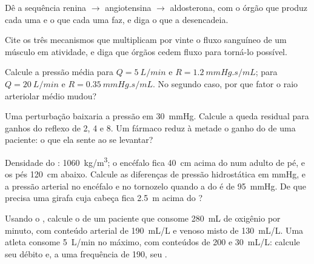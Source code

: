 \begin{exercise}[$\star$]\label{exo:b2:blood-pressure:3}
Dê a sequência renina $\to$ angiotensina $\to$ aldosterona, com o órgão
que produz cada uma e o que cada uma faz, e diga o que a desencadeia.
\end{exercise}

\begin{exercise}[$\star$]\label{exo:b2:blood-pressure:4}
Cite os três mecanismos que multiplicam por vinte o fluxo sanguíneo de
um músculo em atividade, e diga que órgãos cedem fluxo para torná-lo
possível.
\end{exercise}

\begin{exercise}[$\star\star$]\label{exo:b2:blood-pressure:5}
Calcule a pressão média para $Q = \qty{5}{L/min}$ e $R =
\qty{1.2}{mmHg.s/mL}$; para $Q = \qty{20}{L/min}$ e $R =
\qty{0.35}{mmHg.s/mL}$. No segundo caso, por que fator o raio arteriolar
médio mudou?
\end{exercise}

\begin{exercise}[$\star\star$]\label{exo:b2:blood-pressure:6}
Uma perturbação baixaria a pressão em \qty{30}{mmHg}. Calcule a queda
residual para ganhos do reflexo de 2, 4 e 8. Um fármaco reduz à metade
o ganho do  de uma paciente: o que ela sente ao se
levantar?
\end{exercise}

\begin{exercise}[$\star\star$]\label{exo:b2:blood-pressure:7}
Densidade do : \qty{1060}{kg/m^3}; o encéfalo fica \qty{40}{cm}
acima do  num adulto de pé, e os pés \qty{120}{cm} abaixo.
Calcule as diferenças de pressão hidrostática em mmHg, e a pressão
arterial no encéfalo e no tornozelo quando a do  é de
\qty{95}{mmHg}. De que precisa uma girafa cuja cabeça fica
\qty{2.5}{m} acima do ?
\end{exercise}

\begin{exercise}[$\star\star$]\label{exo:b2:blood-pressure:8}
Usando o , calcule o  de um paciente
que consome \qty{280}{mL} de oxigênio por minuto, com conteúdo arterial
de \qty{190}{mL/L} e venoso misto de \qty{130}{mL/L}. Uma atleta
consome \qty{5}{L/min} no máximo, com conteúdos de 200 e
\qty{30}{mL/L}: calcule seu débito e, a uma frequência de 190, seu
.
\end{exercise}

